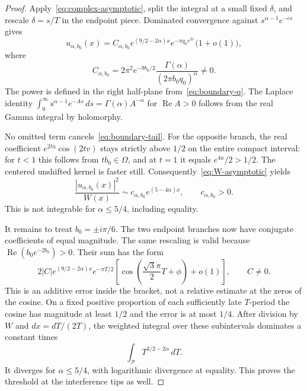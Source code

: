 \documentclass[11pt,a4paper]{article}
\numberwithin{equation}{section}
\theoremstyle{definition}
\theoremstyle{remark}
\begin{document}
\begin{proof}
Apply~\eqref{eq:complex-asymptotic}, split the integral at a small fixed $\delta$, and rescale $\delta=s/T$ in the endpoint piece. Dominated convergence against $s^{\alpha-1}e^{-cs}$ gives
\begin{equation}\label{eq:boundary-tail}
 u_{\alpha,b_0}(x)
 =C_{\alpha,b_0}e^{(9/2-2\alpha)x}
       e^{-\pi q_0e^{2x}}\bigl(1+o(1)\bigr),
\end{equation}
where
\begin{equation}\label{eq:boundary-constant}
 C_{\alpha,b_0}
 =2\pi^2 e^{-9b_0/2}
      \frac{\Gamma(\alpha)}{(2\pi b_0q_0)^\alpha}\ne0.
\end{equation}
The power is defined in the right half-plane from~\eqref{eq:boundary-q}. The Laplace identity
$\int_0^\infty s^{\alpha-1}e^{-As}\,ds
 =\Gamma(\alpha)A^{-\alpha}$ for $\operatorname{Re}A>0$
follows from the real Gamma integral by holomorphy.

No omitted term cancels~\eqref{eq:boundary-tail}. For the opposite branch, the real coefficient $e^{2tu}\cos(2tv)$ stays strictly above $1/2$ on the entire compact interval: for $t<1$ this follows from $tb_0\in\Omega$, and at $t=1$ it equals $e^{4u}/2>1/2$. The centered unshifted kernel is faster still. Consequently~\eqref{eq:W-asymptotic} yields
\begin{equation}\label{eq:boundary-weighted-tail}
 \frac{|u_{\alpha,b_0}(x)|^2}{W(x)}
 \sim c_{\alpha,b_0}e^{(5-4\alpha)x},
 \qquad c_{\alpha,b_0}>0.
\end{equation}
This is not integrable for $\alpha\le5/4$, including equality.

It remains to treat $b_0=\pm i\pi/6$. The two endpoint branches now have conjugate coefficients of equal magnitude. The same rescaling is valid because $\operatorname{Re}(b_0e^{-2b_0})>0$. Their sum has the form
\begin{equation}\label{eq:boundary-tip}
 2|C|e^{(9/2-2\alpha)x}e^{-\pi T/2}
 \left[\cos\left(\frac{\sqrt3\pi}{2}T+\phi\right)+o(1)\right],
 \qquad C\ne0.
\end{equation}
This is an additive error inside the bracket, not a relative estimate at the zeros of the cosine. On a fixed positive proportion of each sufficiently late $T$-period the cosine has magnitude at least $1/2$ and the error is at most $1/4$. After division by $W$ and $dx=dT/(2T)$, the weighted integral over these subintervals dominates a constant times
\[
 \int_{\mathcal P} T^{3/2-2\alpha}\,dT.
\]
It diverges for $\alpha\le5/4$, with logarithmic divergence at equality. This proves the threshold at the interference tips as well.


\end{proof}
\end{document}
